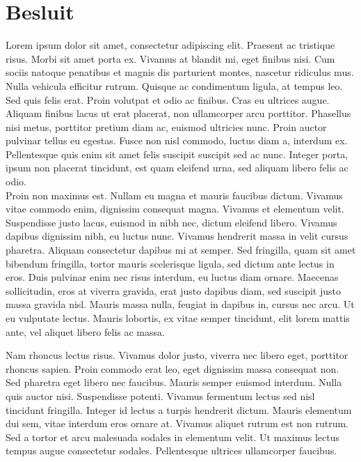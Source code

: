 \chapter{Besluit}

Lorem ipsum dolor sit amet, consectetur adipiscing elit. Praesent ac tristique risus. Morbi sit amet porta ex. Vivamus at blandit mi, eget finibus nisi. Cum sociis natoque penatibus et magnis dis parturient montes, nascetur ridiculus mus. Nulla vehicula efficitur rutrum. Quisque ac condimentum ligula, at tempus leo. Sed quis felis erat. Proin volutpat et odio ac finibus. Cras eu ultrices augue. Aliquam finibus lacus ut erat placerat, non ullamcorper arcu porttitor. Phasellus nisi metus, porttitor pretium diam ac, euismod ultricies nunc. Proin auctor pulvinar tellus eu egestas. Fusce non nisl commodo, luctus diam a, interdum ex. Pellentesque quis enim sit amet felis suscipit suscipit sed ac nunc. Integer porta, ipsum non placerat tincidunt, est quam eleifend urna, sed aliquam libero felis ac odio.\\

Proin non maximus est. Nullam eu magna et mauris faucibus dictum. Vivamus vitae commodo enim, dignissim consequat magna. Vivamus et elementum velit. Suspendisse justo lacus, euismod in nibh nec, dictum eleifend libero. Vivamus dapibus dignissim nibh, eu luctus nunc. Vivamus hendrerit massa in velit cursus pharetra. Aliquam consectetur dapibus mi at semper. Sed fringilla, quam sit amet bibendum fringilla, tortor mauris scelerisque ligula, sed dictum ante lectus in eros. Duis pulvinar enim nec risus interdum, eu luctus diam ornare. Maecenas sollicitudin, eros at viverra gravida, erat justo dapibus diam, sed suscipit justo massa gravida nisl. Mauris massa nulla, feugiat in dapibus in, cursus nec arcu. Ut eu vulputate lectus. Mauris lobortis, ex vitae semper tincidunt, elit lorem mattis ante, vel aliquet libero felis ac massa.

Nam rhoncus lectus risus. Vivamus dolor justo, viverra nec libero eget, porttitor rhoncus sapien. Proin commodo erat leo, eget dignissim massa consequat non. Sed pharetra eget libero nec faucibus. Mauris semper euismod interdum. Nulla quis auctor nisi. Suspendisse potenti. Vivamus fermentum lectus sed nisl tincidunt fringilla. Integer id lectus a turpis hendrerit dictum. Mauris elementum dui sem, vitae interdum eros ornare at. Vivamus aliquet rutrum est non rutrum. Sed a tortor et arcu malesuada sodales in elementum velit. Ut maximus lectus tempus augue consectetur sodales. Pellentesque ultrices ullamcorper faucibus.\\

